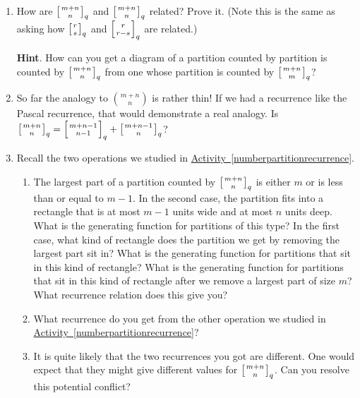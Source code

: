 \documentclass{book}
\begin{document}
\begin{activity}
\begin{enumerate}[font=\bfseries,label=(\alph*),ref=\alph*]
\noindent\item\label{task-281} \hypertarget{p-1620}{}%
How are \(\left[{m+n\atop n}\right]_q\) and \(\left[{m+n\atop n}\right]_q\) related? Prove it. (Note this is the same as asking how \(\left[{r\atop s}\right]_q\) and \(\left[{r\atop r-s}\right]_q\) are related.)%
\par\smallskip%
\noindent\textbf{Hint}.\hypertarget{hint-219}{}\quad%
\hypertarget{p-1621}{}%
How can you get a diagram of a partition counted by partition is counted by \(\left[{m+n\atop n}\right]_q\) from one whose partition is counted by \(\left[{m+n\atop m}\right]_q\)?%
\par\smallskip%
\noindent\item\label{task-282} \hypertarget{p-1623}{}%
So far the analogy to \(\binom{m+n}{n}\) is rather thin! If we had a recurrence like the Pascal recurrence, that would demonstrate a real analogy. Is \(\left[{m+n\atop n}\right]_q= \left[{m+n-1\atop n-1}\right]_q+\left[{m+n-1\atop n}\right]_q\)?%
\par\smallskip%
\noindent\item\label{task-283} \hypertarget{p-1625}{}%
Recall the two operations we studied in \hyperref[numberpartitionrecurrence]{Activity~\ref{numberpartitionrecurrence}}.%
\begin{enumerate}[font=\bfseries,label=(\roman*),ref=\theenumi.\roman*]
\item\label{task-284} \hypertarget{p-1626}{}%
The largest part of a partition counted by \(\left[{m+n\atop n}\right]_q\) is either \(m\) or is less than or equal to \(m-1\).  In the second case, the partition fits into a rectangle that is at most \(m-1\) units wide and at most \(n\) units deep.  What is the generating function for partitions of this type?  In the first case, what kind of rectangle does the partition we get by removing the largest part sit in?  What is the generating function for partitions that sit in this kind of rectangle?  What is the generating function for partitions that sit in this kind of rectangle after we remove a largest part of size \(m\)?  What recurrence relation does this give you?%
\par\smallskip%
\noindent\item\label{task-285} \hypertarget{p-1630}{}%
What recurrence do you get from the other operation we studied in \hyperref[numberpartitionrecurrence]{Activity~\ref{numberpartitionrecurrence}}?%
\par\smallskip%
\noindent\item\label{task-286} \hypertarget{p-1632}{}%
It is quite likely that the two recurrences you got are different.  One would expect that they might give different values for \(\left[{m+n\atop n}\right]_q\).  Can you resolve this potential conflict?%

\end{enumerate}
\end{enumerate}
\end{activity}
\end{document}
